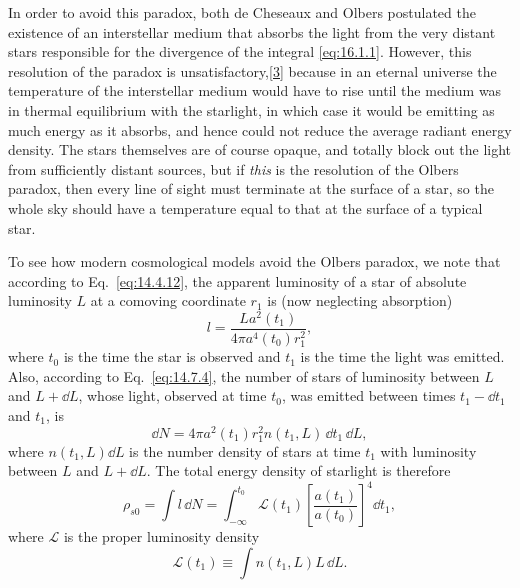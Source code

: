 In order to avoid this paradox, both de Cheseaux and Olbers postulated the
existence of an interstellar medium that absorbs the light from the very
distant stars responsible for the divergence of the integral
\eqref{eq:16.1.1}. However, this resolution of the paradox is
unsatisfactory,\hyperref[ch16-ref-3]{[3]} because in an eternal universe the
temperature of the interstellar medium would have to rise until the medium was
in thermal equilibrium with the starlight, in which case it would be emitting
as much energy as it absorbs, and hence could not reduce the average radiant
energy density. The stars themselves are of course opaque, and totally block
out the light from sufficiently distant sources, but if \emph{this} is the
resolution of the Olbers paradox, then every line of sight must terminate at
the surface of a star, so the whole sky should have a temperature equal to that
at the surface of a typical star.

To see how modern cosmological models avoid the Olbers paradox, we note that
according to Eq.~\eqref{eq:14.4.12}, the apparent luminosity of a star of
absolute luminosity \(L\) at a comoving coordinate \(r_1\) is (now neglecting
absorption)
\[
  l=\frac{L a^2(t_1)}{4\pi a^4(t_0)r_1^2},
\]
where \(t_0\) is the time the star is observed and \(t_1\) is the time the light
was emitted. Also, according to Eq.~\eqref{eq:14.7.4}, the number of stars of
luminosity between \(L\) and \(L+\dd L\), whose light, observed at time \(t_0\),
was emitted between times \(t_1-\dd t_1\) and \(t_1\), is
\[
  \dd N
  =
  4\pi a^2(t_1)r_1^2 n(t_1,L)\,\dd t_1\,\dd L,
\]
where \(n(t_1,L)\dd L\) is the number density of stars at time \(t_1\) with
luminosity between \(L\) and \(L+\dd L\). The total energy density of starlight
is therefore
\begin{equation}
  \rho_{s0}
  =
  \int l\,\dd N
  =
  \int_{-\infty}^{t_0}
  \mathscr L(t_1)
  \left[\frac{a(t_1)}{a(t_0)}\right]^4
  \dd t_1,
  \tag{16.1.2}\label{eq:16.1.2}
\end{equation}
where \(\mathscr L\) is the proper luminosity density
\[
  \mathscr L(t_1)
  \equiv
  \int n(t_1,L)L\,\dd L.
\]

